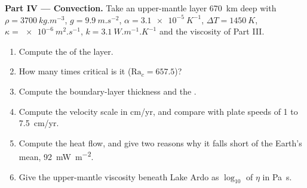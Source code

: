 \begin{problem}
\medskip\noindent\textbf{Part IV --- Convection.} Take an upper-mantle layer
\qty{670}{km} deep with $\rho = \qty{3700}{kg.m^{-3}}$, $g =
\qty{9.9}{m.s^{-2}}$, $\alpha = \qty{3.1e-5}{K^{-1}}$, $\Delta T =
\qty{1450}{K}$, $\kappa = \qty{e-6}{m^2.s^{-1}}$, $k = \qty{3.1}{W.m^{-1}.K^{-1}}$
and the viscosity of Part III.
\begin{enumerate}[resume]
  \item Compute the  of the layer.
  \item How many times critical is it ($\mathrm{Ra}_c = 657.5$)?
  \item Compute the boundary-layer thickness and the .
  \item Compute the velocity scale in \unit{cm/yr}, and compare with plate
        speeds of 1 to \qty{7.5}{cm/yr}.
  \item Compute the heat flow, and give two reasons why it falls short of the
        Earth's mean, \qty{92}{mW.m^{-2}}.
  \item Give the upper-mantle viscosity beneath Lake Ardo as $\log_{10}$ of
        $\eta$ in \unit{Pa.s}.
\end{enumerate}
\end{problem}
